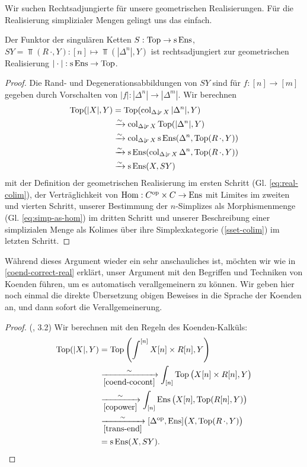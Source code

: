 Wir suchen Rechtsadjungierte für unsere geometrischen
Realisierungen. Für die Realisierung simplizialer Mengen gelingt uns
das einfach.
\begin{satz}
  Der Funktor der singulären Ketten $S: \operatorname{Top} \to \operatorname{s}\operatorname{Ens}$, $SY
  = \Top(R \, \cdot, Y): [n] \mapsto \Top(|\Delta^n|, Y)$ ist
  rechtsadjungiert zur geometrischen Realisierung
  $|\cdot|: \operatorname{s}\operatorname{Ens} \to \operatorname{Top}$.
\end{satz}
\begin{proof}
  Die Rand- und Degenerationsabbildungen von $SY$ sind für $f: [n] \to
  [m]$ gegeben durch Vorschalten von $|f|: |\Delta^n| \to
  |\Delta^m|$. Wir berechnen
  \begin{align*}
    \operatorname{Top}(|X|, Y)
    & = \operatorname{Top}(\operatorname{col}_{\Delta \downarrow \! {\scriptstyle r} \, X} |\Delta^n|, Y) \\
    & \xrightarrow[]{\sim} \operatorname{col}_{\Delta \downarrow \! {\scriptstyle r} \, X} \operatorname{Top}(|\Delta^n|, Y) \\
    & \xrightarrow[]{\sim} \operatorname{col}_{\Delta \downarrow \! {\scriptstyle r} \, X} \operatorname{s}\operatorname{Ens}(\Delta^n, \operatorname{Top}(R \, \cdot, Y)) \\
    & \xrightarrow[]{\sim} \operatorname{s}\operatorname{Ens}(\operatorname{col}_{\Delta \downarrow \! {\scriptstyle r} \, X} \Delta^n, \operatorname{Top}(R \, \cdot, Y)) \\
    & \xrightarrow[]{\sim} \operatorname{s}\operatorname{Ens}(X, SY)
  \end{align*}  
  mit der Definition der geometrischen Realisierung im ersten Schritt
  (Gl. \ref{eq:real-colim}), der Verträglichkeit von $\operatorname{Hom}:
  C^\mathrm{op} \times C \to \operatorname{Ens}$ mit Limites im zweiten und vierten Schritt,
  unserer Bestimmung der $n$-Simplizes als Morphismenmenge
  (Gl. \ref{eq:simp-as-hom}) im dritten Schritt und unserer
  Beschreibung einer simplizialen Menge als Kolimes über ihre
  Simplexkategorie (\ref{sset-colim}) im letzten Schritt.
\end{proof}
Während dieses Argument wieder ein sehr anschauliches ist, möchten wir
wie in \ref{coend-correct-real} erklärt, unser Argument mit den
Begriffen und Techniken von Koenden führen, um es automatisch
verallgemeinern zu können. Wir geben hier noch einmal die direkte
Übersetzung obigen Beweises in die Sprache der Koenden an, und dann
sofort die Verallgemeinerung.
\begin{proof} (\cite{Lore}, 3.2)
  Wir berechnen mit den Regeln des Koenden-Kalküls:
  \begin{align*}
     \operatorname{Top}(|X|, Y)
     &= \operatorname{Top} \left( \int^{[n]} X[n] \times R[n], Y \right) \\
     & \xrightarrow[\ref{coend-cocont}]{\sim}
       \int_{[n]} \operatorname{Top} \big( X[n] \times R[n], Y \big) \\
     & \xrightarrow[\ref{copower}]{\sim}
       \int_{[n]} \operatorname{Ens} \big( X[n], \operatorname{Top}(R[n], Y) \big) \\
     & \xrightarrow[\ref{trans-end}]{\sim}
       [\Delta^\mathrm{op}, \operatorname{Ens}] \big( X, \operatorname{Top}(R \, \cdot, Y) \big) \\
     &= \operatorname{s}\operatorname{Ens}(X, SY).
  \end{align*}
\end{proof}

